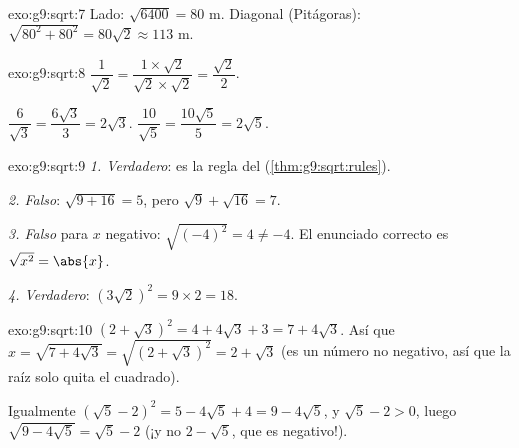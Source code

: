 \begin{solution}{exo:g9:sqrt:7}
Lado: $\sqrt{6400} = 80$ m. Diagonal (Pitágoras):
$\sqrt{80^2 + 80^2} = 80\sqrt2 \approx 113$ m.
\end{solution}

\begin{solution}{exo:g9:sqrt:8}
$\dfrac{1}{\sqrt2} = \dfrac{1 \times \sqrt2}{\sqrt2 \times \sqrt2}
= \dfrac{\sqrt2}{2}$.

$\dfrac{6}{\sqrt3} = \dfrac{6\sqrt3}{3} = 2\sqrt3$.
\quad
$\dfrac{10}{\sqrt5} = \dfrac{10\sqrt5}{5} = 2\sqrt5$.
\end{solution}

\begin{solution}{exo:g9:sqrt:9}
\emph{1. Verdadero}: es la regla del  (\cref{thm:g9:sqrt:rules}).

\emph{2. Falso}: $\sqrt{9 + 16} = 5$, pero $\sqrt9 + \sqrt{16} = 7$.

\emph{3. Falso} para $x$ negativo: $\sqrt{(-4)^2} = 4 \neq -4$. El
enunciado correcto es $\sqrt{x^2} = \abs{x}$.

\emph{4. Verdadero}: $\left(3\sqrt2\right)^2 = 9 \times 2 = 18$.
\end{solution}

\begin{solution}{exo:g9:sqrt:10}
$\left(2 + \sqrt3\right)^2 = 4 + 4\sqrt3 + 3 = 7 + 4\sqrt3$. Así que
$x = \sqrt{7 + 4\sqrt3} = \sqrt{\left(2+\sqrt3\right)^2} = 2 + \sqrt3$
(es un número no negativo, así que la raíz solo quita el cuadrado).

Igualmente $\left(\sqrt5 - 2\right)^2 = 5 - 4\sqrt5 + 4 = 9 - 4\sqrt5$,
y $\sqrt5 - 2 > 0$, luego
$\sqrt{9 - 4\sqrt5} = \sqrt5 - 2$ (¡y no $2 - \sqrt5$, que es
negativo!).
\end{solution}

